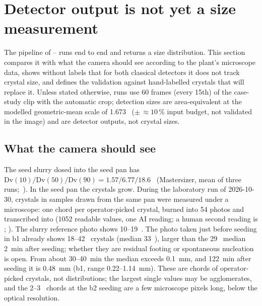 \section{Detector output is not yet a size measurement}\label{sec:csd}

The pipeline of -- runs end to end and returns a size distribution. This
section compares it with what the camera should see according to the plant's microscope data, shows without labels
that for both classical detectors it does not track crystal size, and defines the validation against hand-labelled
crystals that will replace it. Unless stated otherwise, runs use 60 frames (every 15th) of the case-study clip with
the automatic crop; detection sizes are area-equivalent at the modelled geometric-mean scale of 1.673~\umpx{}
($\pm\,{\approx}10$\,\% input budget, not validated in the image) and are detector outputs, not crystal sizes.

\subsection{What the camera should see}\label{sec:expected}

The seed slurry dosed into the seed pan has $\mathrm{Dv}(10)/\mathrm{Dv}(50)/\mathrm{Dv}(90) = 1.57/6.77/18.6$~\um{}
(Mastersizer, mean of three runs;~\citealp{Mastersizer2025}). In the seed pan the crystals grow. During the laboratory run
of 2026-10-30, crystals in samples drawn from the same pan were measured under a microscope: one chord per
operator-picked crystal, burned into 54 photos and transcribed into 
(1052 readable values, one AI reading; a human second reading is ;
). The slurry reference photo shows 10--19~\um. The photo taken just before seeding in b1
already shows 18--42~\um{} crystals (median 33~\um), larger than the 29~\um{} median 2~min after seeding; whether
they are residual footing or spontaneous nucleation is open. From about 30--40~min the median exceeds 0.1~mm, and
122~min after seeding it is 0.48~mm (b1, range 0.22--1.14~mm). These are chords of operator-picked crystals, not
distributions; the largest single values may be agglomerates, and the 2--3~\um{} chords at the b2 seeding are a few
microscope pixels long, below the optical resolution.

